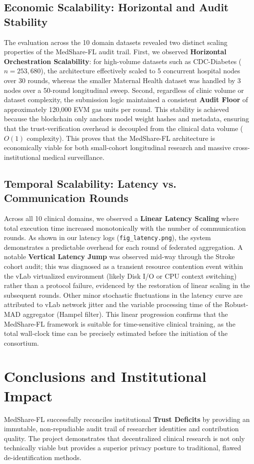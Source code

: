 \documentclass[10pt, a4paper, twocolumn]{article}
\begin{document}
\subsection{Economic Scalability: Horizontal and Audit Stability}
The evaluation across the 10 domain datasets revealed two distinct scaling properties of the MedShare-FL audit trail. First, we observed \textbf{Horizontal Orchestration Scalability}: for high-volume datasets such as CDC-Diabetes ($n=253,680$), the architecture effectively scaled to 5 concurrent hospital nodes over 30 rounds, whereas the smaller Maternal Health dataset was handled by 3 nodes over a 50-round longitudinal sweep. Second, regardless of clinic volume or dataset complexity, the submission logic maintained a consistent \textbf{Audit Floor} of approximately 120,000 EVM gas units per round. This stability is achieved because the blockchain only anchors model weight hashes and metadata, ensuring that the trust-verification overhead is decoupled from the clinical data volume ($O(1)$ complexity). This proves that the MedShare-FL architecture is economically viable for both small-cohort longitudinal research and massive cross-institutional medical surveillance.

\subsection{Temporal Scalability: Latency vs. Communication Rounds}
Across all 10 clinical domains, we observed a \textbf{Linear Latency Scaling} where total execution time increased monotonically with the number of communication rounds. As shown in our latency logs (\texttt{fig\_latency.png}), the system demonstrates a predictable overhead for each round of federated aggregation. A notable \textbf{Vertical Latency Jump} was observed mid-way through the Stroke cohort audit; this was diagnosed as a transient resource contention event within the vLab virtualized environment (likely Disk I/O or CPU context switching) rather than a protocol failure, evidenced by the restoration of linear scaling in the subsequent rounds. Other minor stochastic fluctuations in the latency curve are attributed to vLab network jitter and the variable processing time of the Robust-MAD aggregator (Hampel filter). This linear progression confirms that the MedShare-FL framework is suitable for time-sensitive clinical training, as the total wall-clock time can be precisely estimated before the initiation of the consortium.

\section{Conclusions and Institutional Impact}
MedShare-FL successfully reconciles institutional \textbf{Trust Deficits} by providing an immutable, non-repudiable audit trail of researcher identities and contribution quality. The project demonstrates that decentralized clinical research is not only technically viable but provides a superior privacy posture to traditional, flawed de-identification methods.
\end{document}
